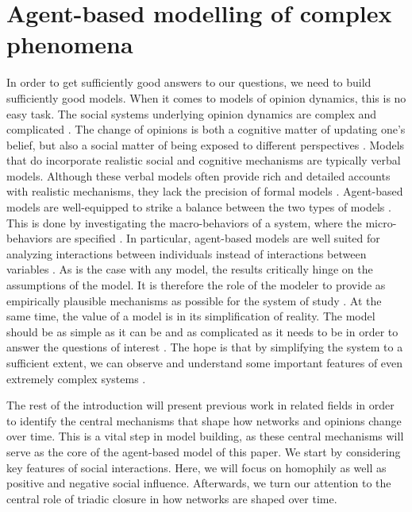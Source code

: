 \documentclass{article}
\begin{document}
\section{Agent-based modelling of complex phenomena}
In order to get sufficiently good answers to our questions, we need to build sufficiently good models. 
When it comes to models of opinion dynamics, this is no easy task. 
The social systems underlying opinion dynamics are complex and complicated \cite{mas2019challenges}. 
The change of opinions is both a cognitive matter of updating one’s belief, but also a social matter of being exposed to different perspectives \cite{flache_models_2017,friedkin_social_1990,spears_social_2021}. 
Models that do incorporate realistic social and cognitive mechanisms are typically verbal models. 
Although these verbal models often provide rich and detailed accounts with realistic mechanisms, they lack the precision of formal models \cite{fogarty_ten_2022,galesic_integrating_2021,smaldino_how_2020}. 
Agent-based models are well-equipped to strike a balance between the two types of models \cite{flache_between_2018,galesic_integrating_2021,epstein1999agent,mas2014cultural}. This is done by investigating the macro-behaviors of a system, where the micro-behaviors are specified \cite{bruch_agent-based_2015,epstein1999agent,flache_between_2018}. In particular, agent-based models are well suited for analyzing interactions between individuals instead of interactions between variables \cite{geschke2019triple}. As is the case with any model, the results critically hinge on the assumptions of the model. It is therefore the role of the modeler to provide as empirically plausible mechanisms as possible for the system of study \cite{crooks2012introduction,epstein1999agent,page2010diversity}. At the same time, the value of a model is in its simplification of reality. The model should be as simple as it can be and as complicated as it needs to be in order to answer the questions of interest \cite{smaldino_how_2020}. The hope is that by simplifying the system to a sufficient extent, we can observe and understand some important features of even extremely complex systems \cite{fogarty_ten_2022,smaldino_how_2020,smaldino_models_2016}.

The rest of the introduction will present previous work in related fields in order to identify the central mechanisms that shape how networks and opinions change over time. This is a vital step in model building, as these central mechanisms will serve as the core of the agent-based model of this paper. We start by considering key features of social interactions. Here, we will focus on homophily as well as positive and negative social influence. Afterwards, we turn our attention to the central role of triadic closure in how networks are shaped over time.
\end{document}
